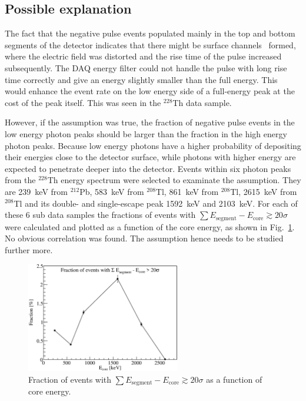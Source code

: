 \subsection{Possible explanation}
\label{s:ii:exp}
The fact that the negative pulse events populated mainly in the top and bottom segments of the detector indicates that there might be surface channels~\cite{Sur05} formed, where the electric field was distorted and the rise time of the pulse increased subsequently. The DAQ energy filter could not handle the pulse with long rise time correctly and give an energy slightly smaller than the full energy. This would enhance the event rate on the low energy side of a full-energy peak at the cost of the peak itself. This was seen in the $^{228}$Th data sample. 

However, if the assumption was true, the fraction of negative pulse events in the low energy photon peaks should be larger than the fraction in the high energy photon peaks. Because low energy photons have a higher probability of depositing their energies close to the detector surface, while photons with higher energy are expected to penetrate deeper into the detector. Events within six photon peaks from the $^{228}$Th energy spectrum were selected to examinate the assumption. They are 239~keV from $^{212}$Pb, 583~keV from $^{208}$Tl, 861~keV from $^{208}$Tl, 2615~keV from $^{208}$Tl and its double- and single-escape peak 1592~keV and 2103~keV. For each of these 6 sub data samples the fractions of events with $\sum E_{\text{segment}} - E_{\text{core}} \gtrsim 20\sigma$ were calculated and plotted as a function of the core energy, as shown in Fig.~\ref{f:fnp_e}. No obvious correlation was found. The assumption hence needs to be studied further more. 

\begin{figure}[tphb]
\centering
\includegraphics[width=0.6\textwidth]{fnp_e}
\caption{Fraction of events with $\sum E_{\text{segment}} - E_{\text{core}} \gtrsim 20\sigma$ as a function of core energy.}
\label{f:fnp_e}
\end{figure}

